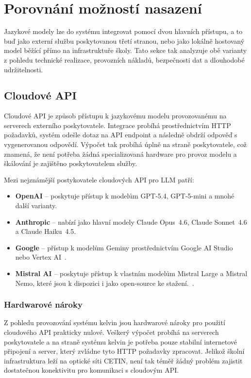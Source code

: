 \section{Porovnání možností nasazení}
\label{sec:selection-deployment}

Jazykové modely lze do systému integrovat pomocí dvou hlavních přístupu, a to buď jako externí službu poskytovanou třetí stranou, nebo jako lokálně hostovaný model běžící přímo na infrastruktuře školy.
Tato sekce tak analyzuje obě varianty z pohledu technické realizace, provozních nákladů, bezpečnosti dat a dlouhodobé udržitelnosti.

\subsection{Cloudové API}
\label{subsec:deployment-cloud}

Cloudové API je způsob přístupu k jazykovému modelu provozovanému na serverech externího poskytovatele.
Integrace probíhá prostřednictvím HTTP požadavků, systém odešle dotaz na API endpoint a následně obdrží odpověď s vygenerovanou odpovědí.
Výpočet tak probíhá úplně na straně poskytovatele, což znamená, že není potřeba žádná specializovaná hardware pro provoz modelu a škálování je zajištěno poskytovatelem služby.

Mezi nejznámější postykovatele cloudových API pro LLM patří:
\begin{itemize}
    \item \textbf{OpenAI} -- poskytuje přístup k modelům GPT-5.4, GPT-5-mini a mnohé další varianty\cite{openai_api}.
    \item \textbf{Anthropic} -- nabízí jako hlavní modely Claude Opus~4.6, Claude Sonnet~4.6 a Claude Haiku~4.5\cite{anthropic_api}.
    \item \textbf{Google} -- přístup k modelům Geminy prostřednictvím Google AI Studio nebo Vertex AI~\cite{google_api}.
    \item \textbf{Mistral AI} -- poskytuje přístup k vlastním modelům Mistral Large a Mistral Nemo, které jsou k dispozici i jako open-source ke stažení.~\cite{mistral_api}.
\end{itemize}

\subsubsection*{Hardwarové nároky}

Z pohledu provozování systému kelvin jsou hardwarové nároky pro použití cloudového API prakticky nulové.
Veškerý výpočet probíhá na serverech poskytovatele a na straně systému kelvin je potřeba pouze stabilní internetové připojení a server, který zvládne tyto HTTP požadavky zpracovat.
Jelikož školní infrastruktura leží na optické síti CETIN, není tak téměř žádný problém zajistit dostatečnou konektivitu pro komunikaci s cloudovým API\@.

